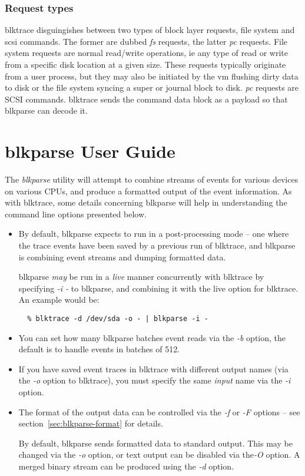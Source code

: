 \documentclass{article}
\begin{document}
\subsubsection{\label{sec:request-types}Request types}
blktrace disguingishes between two types of block layer requests,
file system and scsi commands. The former are dubbed \emph{fs}
requests, the latter \emph{pc} requests. File system requests are
normal read/write operations, ie any type of read or write from a
specific disk location at a given size. These requests typically
originate from a user process, but they may also be initiated by
the vm flushing dirty data to disk or the file system syncing
a super or journal block to disk. \emph{pc} requests are SCSI
commands. blktrace sends the command data block as a payload
so that blkparse can decode it.

\newpage\section{\label{sec:blkparse-ug}blkparse User Guide}

The \emph{blkparse} utility will attempt to combine streams of events
for various devices on various CPUs, and produce a formatted output of
the event information. As with blktrace, some details concerning blkparse
will help in understanding the command line options presented below.

\begin{itemize}
  \item By default, blkparse expects to run in a post-processing mode
  -- one where the trace events have been saved by a previous run
  of blktrace, and blkparse is combining event streams and dumping
  formatted data. 

  blkparse \emph{may} be run in a \emph{live} manner concurrently with
  blktrace by specifying \emph{-i -} to blkparse, and combining it with
  the live option for blktrace. An example would be:

  \begin{verbatim}
  % blktrace -d /dev/sda -o - | blkparse -i -
  \end{verbatim}

  \item You can set how many blkparse batches event reads via the
  \emph{-b} option, the default is to handle events in batches of 512.

  \item If you have saved event traces in blktrace with different output
  names (via the \emph{-o} option to blktrace), you must specify the
  same \emph{input} name via the \emph{-i} option.

  \item The format of the output data can be controlled via the \emph{-f}
  or \emph{-F} options -- see section~\ref{sec:blkparse-format} for details.

  By default, blkparse sends formatted data to standard output. This may
  be changed via the \emph{-o} option, or text output can be disabled
  via the\emph{-O} option. A merged binary stream can be produced using
  the \emph{-d} option.

\end{itemize}
\end{document}
